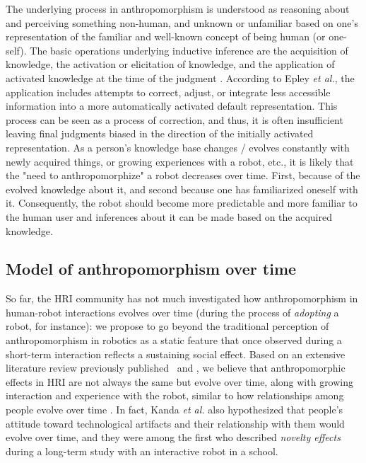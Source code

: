 \documentclass{acm_proc_article-sp}
\begin{document}
The underlying process in anthropomorphism is understood as reasoning about and
perceiving something non-human, and unknown or unfamiliar based on one's
representation of the familiar and well-known concept of being human (or
one-self). The basic operations underlying inductive inference are the
acquisition of knowledge, the activation or elicitation of knowledge, and the
application of activated knowledge at the time of the judgment
\cite{epley_when_2008}. According to Epley \textit{et al.}, the application
includes attempts to correct, adjust, or integrate less accessible information
into a more automatically activated default representation. This process can be
seen as a process of correction, and thus, it is often insufficient leaving
final judgments biased in the direction of the initially activated
representation. As a person's knowledge base changes / evolves constantly with
newly acquired things, or growing experiences with a robot, etc., it is likely
that the "need to anthropomorphize" a robot decreases over time. First, because
of the evolved knowledge about it, and second because one has familiarized
oneself with it.  Consequently, the robot should become more predictable and
more familiar to the human user and inferences about it can be made based on
the acquired knowledge.

\subsection{Model of anthropomorphism over time}
\label{sec:modelintro}

So far, the HRI community has not much investigated how anthropomorphism in
human-robot interactions evolves over time (during the process of
\emph{adopting} a robot, for instance): we propose to go beyond the traditional
perception of anthropomorphism in robotics as a static feature that once
observed during a short-term interaction reflects a sustaining social effect.
Based on an extensive literature review previously
published~\cite{fink_anthropomorphism_2012} and 
, we believe that
anthropomorphic effects in HRI are not always the same but evolve over time,
along with growing interaction and experience with the robot, similar to how
relationships among people evolve over time . In
fact, Kanda \textit{et al.} \cite{kanda_interactive_2004} also hypothesized
that people's attitude toward technological artifacts and their relationship
with them would evolve over time, and they were among the first who described
\textit{novelty effects} during a long-term study with an interactive robot in
a school.
\end{document}
